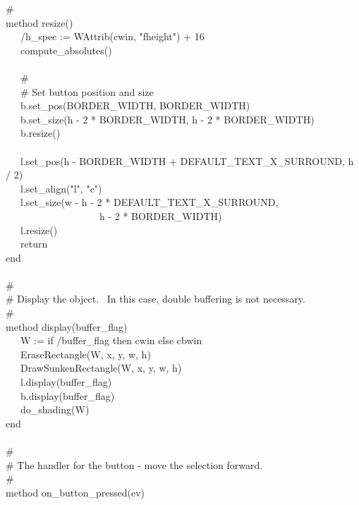 {\>   \# \\
\>   method resize() \\
\>   \ \ \ /h\_spec := WAttrib(cwin, "fheight") + 16 \\
\>   \ \ \ compute\_absolutes() \\
\ \\
\>   \ \ \ \# \\
\>   \ \ \ \# Set button position and size \\
\>   \ \ \ b.set\_pos(BORDER\_WIDTH, BORDER\_WIDTH) \\
\>   \ \ \ b.set\_size(h - 2 * BORDER\_WIDTH, h - 2 * BORDER\_WIDTH) \\
\>   \ \ \ b.resize() \\
\ \\
\>   \ \ \ l.set\_pos(h - BORDER\_WIDTH +
DEFAULT\_TEXT\_X\_SURROUND, h / 2) \\
\>   \ \ \ l.set\_align("l",
"c") \\
\>   \ \ \ l.set\_size(w - h - 2 *
DEFAULT\_TEXT\_X\_SURROUND, \\
\>   \ \ \ \ \ \ \ \ \ \ \ \ \ \ \ \ \ \ \ h - 2 * BORDER\_WIDTH) \\
\>   \ \ \ l.resize() \\
\>   \ \ \ return \\
\>   end \\
\ \\
\>   \# \\
\>   \# Display the object. \ In this case, double buffering is not necessary.\\
\>   \# \\
\>   method display(buffer\_flag) \\
\>   \ \ \ W := if /buffer\_flag then cwin else cbwin \\
\>   \ \ \ EraseRectangle(W, x, y, w, h) \\
\>   \ \ \ DrawSunkenRectangle(W, x, y, w, h) \\
\>   \ \ \ l.display(buffer\_flag) \\
\>   \ \ \ b.display(buffer\_flag) \\
\>   \ \ \ do\_shading(W) \\
\>   end \\
\ \\
\>   \# \\
\>   \# The handler for the button - move the selection forward. \\
\>   \# \\
\>   method on\_button\_pressed(ev) \\
}
